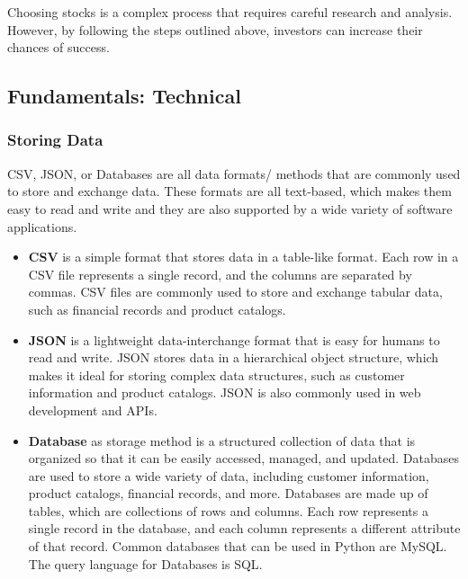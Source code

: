 Choosing stocks is a complex process that requires careful research and analysis. However, by following the steps outlined above, investors can increase their chances of success. \cite{CFITeam2023}

\subsection{Fundamentals: Technical}\label{sec: Fundamentals Methods}
\subsubsection{Storing Data}\label{sec: Storing Data}
\ac{CSV}, \ac{JSON}, or Databases are all data formats/ methods that are commonly used to store and exchange data. These formats are all text-based, which makes them easy to read and write and they are also supported by a wide variety of software applications.\\
\begin{itemize}
\item\textbf{\ac{CSV}} is a simple format that stores data in a table-like format. Each row in a \ac{CSV} file represents a single record, and the columns are separated by commas. \ac{CSV} files are commonly used to store and exchange tabular data, such as financial records and product catalogs.

\item\textbf{\ac{JSON}} is a lightweight data-interchange format that is easy for humans to read and write. \ac{JSON} stores data in a hierarchical object structure, which makes it ideal for storing complex data structures, such as customer information and product catalogs. \ac{JSON} is also commonly used in web development and \ac{API}s.

\item\textbf{Database} as storage method is a structured collection of data that is organized so that it can be easily accessed, managed, and updated. Databases are used to store a wide variety of data, including customer information, product catalogs, financial records, and more. Databases are made up of tables, which are collections of rows and columns. Each row represents a single record in the database, and each column represents a different attribute of that record. Common databases that can be used in Python are \ac{MySQL}. The query language for Databases is \ac{SQL}.\cite{bigdatainsiderDataNoSQL}
\end{itemize}
